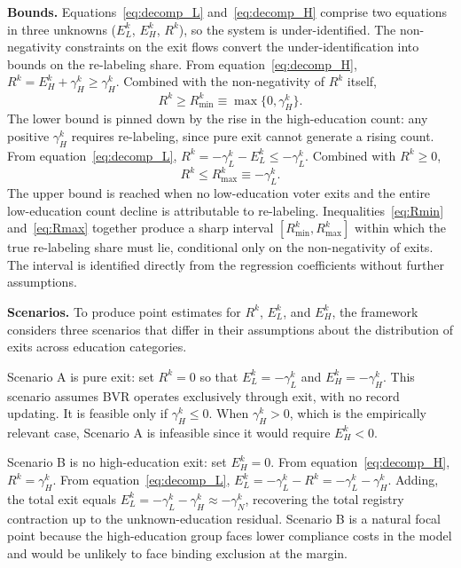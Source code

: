 \textbf{Bounds.} Equations~\eqref{eq:decomp_L} and~\eqref{eq:decomp_H} comprise two equations in three unknowns ($E_L^k$, $E_H^k$, $R^k$), so the system is under-identified. The non-negativity constraints on the exit flows convert the under-identification into bounds on the re-labeling share. From equation~\eqref{eq:decomp_H}, $R^k = E_H^k + \gamma_H^k \geq \gamma_H^k$. Combined with the non-negativity of $R^k$ itself,
\begin{equation}
R^k \geq R_{\min}^k \equiv \max\{0, \gamma_H^k\}.
\label{eq:Rmin}
\end{equation}
The lower bound is pinned down by the rise in the high-education count: any positive $\gamma_H^k$ requires re-labeling, since pure exit cannot generate a rising count. From equation~\eqref{eq:decomp_L}, $R^k = -\gamma_L^k - E_L^k \leq -\gamma_L^k$. Combined with $R^k \geq 0$,
\begin{equation}
R^k \leq R_{\max}^k \equiv -\gamma_L^k.
\label{eq:Rmax}
\end{equation}
The upper bound is reached when no low-education voter exits and the entire low-education count decline is attributable to re-labeling. Inequalities~\eqref{eq:Rmin} and~\eqref{eq:Rmax} together produce a sharp interval $[R_{\min}^k, R_{\max}^k]$ within which the true re-labeling share must lie, conditional only on the non-negativity of exits. The interval is identified directly from the regression coefficients without further assumptions.

\textbf{Scenarios.} To produce point estimates for $R^k$, $E_L^k$, and $E_H^k$, the framework considers three scenarios that differ in their assumptions about the distribution of exits across education categories.

Scenario A is pure exit: set $R^k = 0$ so that $E_L^k = -\gamma_L^k$ and $E_H^k = -\gamma_H^k$. This scenario assumes BVR operates exclusively through exit, with no record updating. It is feasible only if $\gamma_H^k \leq 0$. When $\gamma_H^k > 0$, which is the empirically relevant case, Scenario A is infeasible since it would require $E_H^k < 0$.

Scenario B is no high-education exit: set $E_H^k = 0$. From equation~\eqref{eq:decomp_H}, $R^k = \gamma_H^k$. From equation~\eqref{eq:decomp_L}, $E_L^k = -\gamma_L^k - R^k = -\gamma_L^k - \gamma_H^k$. Adding, the total exit equals $E_L^k = -\gamma_L^k - \gamma_H^k \approx -\gamma_N^k$, recovering the total registry contraction up to the unknown-education residual. Scenario B is a natural focal point because the high-education group faces lower compliance costs in the model and would be unlikely to face binding exclusion at the margin.

